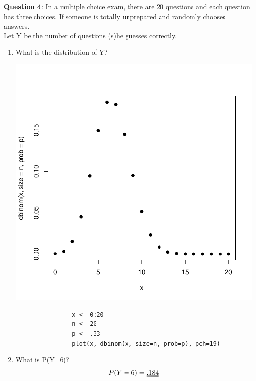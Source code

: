 \documentclass[letterpaper,12pt]{article}
\begin{document}
\begin{flushleft}
    \textbf{Question 4}: In a multiple choice exam, there are 20 questions and each question \\
    has three choices. If someone is totally unprepared and randomly chooses answers. \\
    Let Y be the number of questions (s)he guesses correctly.
\end{flushleft}
\begin{enumerate}[label=(\alph*)]
    \item{What is the distribution of Y?}
        \begin{center}
            \includegraphics{dist.pdf}
            \begin{lstlisting}
                x <- 0:20
                n <- 20
                p <- .33
                plot(x, dbinom(x, size=n, prob=p), pch=19)
            \end{lstlisting}
        \end{center}
    \item{What is P(Y=6)?}
        \begin{align*}
            P(Y=6) = \uuline{.184}
        \end{align*}
        \begin{center}
            \begin{lstlisting}

\end{lstlisting}
\end{center}
\end{enumerate}
\end{document}

